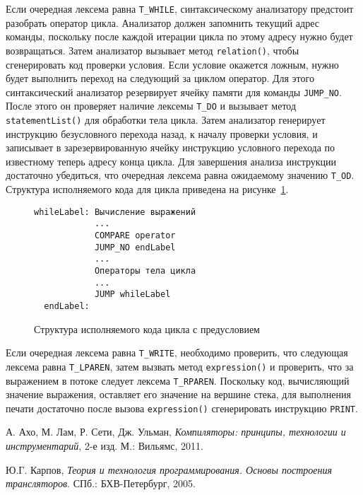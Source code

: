 \documentclass[a4paper,12pt]{article}
\begin{document}
Если очередная лексема равна \texttt{T\_WHILE}, синтаксическому анализатору
предстоит разобрать оператор цикла. Анализатор должен запомнить текущий адрес
команды, поскольку после каждой итерации цикла по этому адресу нужно будет
возвращаться. Затем анализатор вызывает метод \texttt{relation()}, чтобы
сгенерировать код проверки условия. Если условие окажется ложным, нужно будет
выполнить переход на следующий за циклом оператор. Для этого синтаксический
анализатор резервирует ячейку памяти для команды \texttt{JUMP\_NO}.  После этого 
он проверяет наличие лексемы \texttt{T\_DO} и вызывает метод
\texttt{statementList()} для обработки тела цикла. Затем анализатор генерирует
инструкцию безусловного перехода назад, к началу проверки условия, и записывает
в зарезервированную ячейку инструкцию условного перехода по известному теперь
адресу конца цикла. Для завершения анализа инструкции достаточно убедиться, что
очередная лексема равна ожидаемому значению \texttt{T\_OD}. Структура
исполняемого кода для цикла приведена на рисунке~\ref{while-code}.

\begin{figure}
\begin{verbatim}
whileLabel: Вычисление выражений
            ...
            COMPARE operator
            JUMP_NO endLabel
            ...
            Операторы тела цикла
            ...
            JUMP whileLabel
  endLabel: 
\end{verbatim}
\caption{Структура исполняемого кода цикла с предусловием}
\label{while-code}
\end{figure}
                                                   
Если очередная лексема равна \texttt{T\_WRITE}, необходимо проверить, что
следующая лексема равна \texttt{T\_LPAREN}, затем вызвать метод
\texttt{expression()} и проверить, что за выражением в потоке следует лексема
\texttt{T\_RPAREN}. Поскольку код, вычисляющий значение выражения, оставляет его
значение на вершине стека, для выполнения печати достаточно после вызова
\texttt{expression()} сгенерировать инструкцию \texttt{PRINT}.

\begin{thebibliography}{9}

  А. Ахо, М. Лам, Р. Сети, Дж. Ульман,
  \emph{Компиляторы: принципы, технологии и инструментарий}, 2-е изд.
  М.: Вильямс, 2011.

  Ю.Г. Карпов,
  \emph{Теория и технология программирования. Основы построения трансляторов}.
  СПб.: БХВ-Петербург, 2005.
\end{thebibliography}
\end{document}
